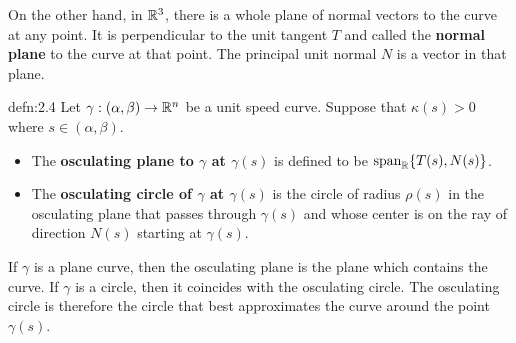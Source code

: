 On the other hand, in $\mathbb{R}^3$, there is a whole plane of normal vectors to the curve at 
any point. It is perpendicular to the unit tangent $T$ and called the {\bf normal plane} to 
the curve at that point. The principal unit normal $N$ is a vector in that plane.

\begin{defn}{defn:2.4}
    Let $\gamma : (\alpha, \beta) \to \mathbb{R}^n$ be a unit speed curve. Suppose that 
    $\kappa(s) > 0$ where $s \in (\alpha, \beta)$.
    \begin{itemize} 
        \item The {\bf osculating plane to $\gamma$ at $\gamma(s)$} is defined to be
        $\operatorname{span}_{\mathbb{R}}\{T(s), N(s)\}$.
        \item The {\bf osculating circle of $\gamma$ at $\gamma(s)$} is the 
        circle of radius $\rho(s)$ in the osculating plane that passes 
        through $\gamma(s)$ and whose center is on the ray of direction 
        $N(s)$ starting at $\gamma(s)$. 
    \end{itemize}
\end{defn}\vspace{-0.25cm} 
If $\gamma$ is a plane curve, then the osculating plane is the plane 
which contains the curve. If $\gamma$ is a circle, then it coincides 
with the osculating circle. The osculating circle is therefore the 
circle that best approximates the curve around the point $\gamma(s)$. 

